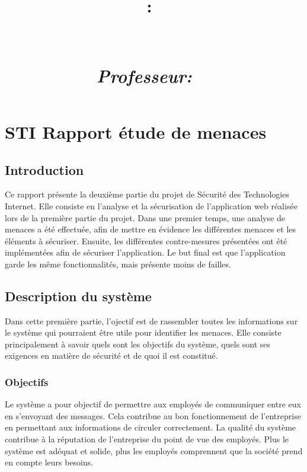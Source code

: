 \documentclass{article}
\title{
\vspace{2in}
\textmd{\textbf{\hmwkClass:\ \hmwkTitle}}\\
\textmd{\textbf{\hmwkProjectTitle}}\\
\normalsize\vspace{0.1in}\small{\hmwkDueDate}\\
\vspace{0.1in}\large{\textit{Professeur:\ \hmwkClassInstructor\ \hmwkClassTime}}
\vspace{3in}
}
\author{\textbf{\hmwkAuthorName}}
\date{} %
\begin{document}
\maketitle



\newpage
\tableofcontents
\newpage

\section{STI Rapport étude de menaces}

\subsection{Introduction}

Ce rapport présente la deuxième partie du projet de Sécurité des
Technologies Internet. Elle consiste en l'analyse et la sécurisation de
l'application web réalisée lors de la première partie du projet. Dans
une premier temps, une analyse de menaces a été effectuée, afin de
mettre en évidence les différentes menaces et les éléments à sécuriser.
Ensuite, les différentes contre-mesures présentées ont été implémentées
afin de sécuriser l'application. Le but final est que l'application
garde les même fonctionnalités, mais présente moins de failles.

\subsection{Description du système}

Dans cette première partie, l'ojectif est de rassembler toutes les
informations sur le système qui pourraient être utile pour identifier
les menaces. Elle consiste principalement à savoir quels sont les
objectifs du système, quels sont ses exigences en matière de sécurité et
de quoi il est constitué.

\subsubsection{Objectifs}

Le système a pour objectif de permettre aux employés de communiquer
entre eux en s'envoyant des messages. Cela contribue au bon
fonctionnement de l'entreprise en permettant aux informations de
circuler correctement. La qualité du système contribue à la réputation
de l'entreprise du point de vue des employés. Plus le système est
adéquat et solide, plus les employés comprennent que la société prend en
compte leurs besoins. 
\end{document}
